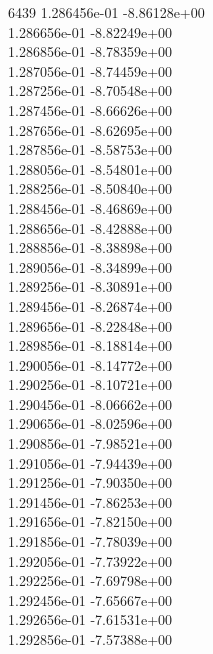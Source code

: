 6439	1.286456e-01	-8.86128e+00	\\ 	1.286656e-01	-8.82249e+00	\\ 	1.286856e-01	-8.78359e+00	\\ 	1.287056e-01	-8.74459e+00	\\ 	1.287256e-01	-8.70548e+00	\\ 	1.287456e-01	-8.66626e+00	\\ 	1.287656e-01	-8.62695e+00	\\ 	1.287856e-01	-8.58753e+00	\\ 	1.288056e-01	-8.54801e+00	\\ 	1.288256e-01	-8.50840e+00	\\ 	1.288456e-01	-8.46869e+00	\\ 	1.288656e-01	-8.42888e+00	\\ 	1.288856e-01	-8.38898e+00	\\ 	1.289056e-01	-8.34899e+00	\\ 	1.289256e-01	-8.30891e+00	\\ 	1.289456e-01	-8.26874e+00	\\ 	1.289656e-01	-8.22848e+00	\\ 	1.289856e-01	-8.18814e+00	\\ 	1.290056e-01	-8.14772e+00	\\ 	1.290256e-01	-8.10721e+00	\\ 	1.290456e-01	-8.06662e+00	\\ 	1.290656e-01	-8.02596e+00	\\ 	1.290856e-01	-7.98521e+00	\\ 	1.291056e-01	-7.94439e+00	\\ 	1.291256e-01	-7.90350e+00	\\ 	1.291456e-01	-7.86253e+00	\\ 	1.291656e-01	-7.82150e+00	\\ 	1.291856e-01	-7.78039e+00	\\ 	1.292056e-01	-7.73922e+00	\\ 	1.292256e-01	-7.69798e+00	\\ 	1.292456e-01	-7.65667e+00	\\ 	1.292656e-01	-7.61531e+00	\\ 	1.292856e-01	-7.57388e+00	\\ \hline
